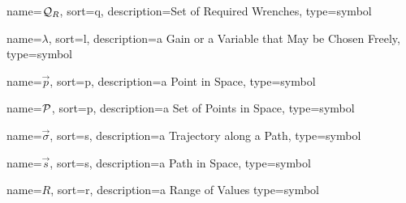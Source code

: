 	{%
		name=\ensuremath{{\set{Q}_R}},
		sort=q,
		description=Set of Required Wrenches,
		type=symbol
	}
	\newcommand{\setofreqwrenches}{\gls{sym:setofreqwrenches}}

	{%
		name={\ensuremath{\lambda}},
		sort=l,
		description=a Gain or a Variable that May be Chosen Freely,
		type=symbol
	}
	\newcommand{\gain}{\gls{sym:gain}}

	{%
		name={\ensuremath{\vec{p}}},
		sort=p,
		description=a Point in Space,
		type=symbol
	}
	\newcommand{\point}{\gls{sym:point}}

	{%
		name={\ensuremath{\set{P}}},
		sort=p,
		description=a Set of Points in Space,
		type=symbol
	}
	\newcommand{\setofpoints}{\gls{sym:setofpoints}}

	{%
		name={\ensuremath{\vec{\sigma}}},
		sort=s,
		description=a Trajectory along a Path,
		type=symbol
	}
	\newcommand{\traj}{\gls{sym:traj}}

	{%
		name={\ensuremath{\vec{s}}},
		sort=s,
		description=a Path in Space,
		type=symbol
	}
	\newcommand{\pathsym}{\gls{sym:pathsym}}

	{%
		name={\ensuremath{R}},
		sort=r,
		description=a Range of Values
		type=symbol
	}
	\newcommand{\range}{\gls{sym:range}}
	\newcommand{\rangetimenorm}{\ensuremath{\range_{\timenorm}}}

